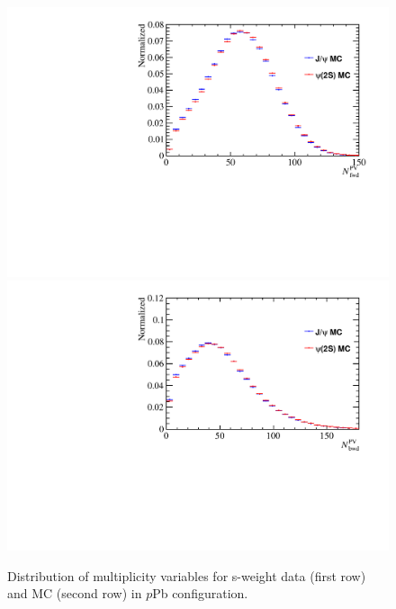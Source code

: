 \begin{figure}[H]
\begin{center}
\includegraphics[width=0.32\linewidth]{pdf/pPb/FWorkdir/Reweight/MCMul.pdf}
\includegraphics[width=0.32\linewidth]{pdf/pPb/BWorkdir/Reweight/MCMul.pdf}
\end{center}
\caption{
	Distribution of multiplicity variables for s-weight data (first row) and MC (second row) in $p$Pb configuration.}
\label{MulReweight}
\end{figure}

